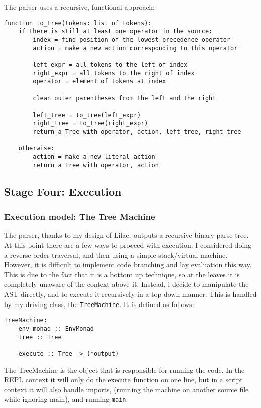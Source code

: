 \documentclass[a4paper, 12pt]{article}
\begin{document}
The parser uses a recursive, functional approach:
\begin{verbatim}
function to_tree(tokens: list of tokens):
	if there is still at least one operator in the source:
		index = find position of the lowest precedence operator
		action = make a new action corresponding to this operator
		
		left_expr = all tokens to the left of index
		right_expr = all tokens to the right of index
		operator = element of tokens at index
		
		clean outer parentheses from the left and the right
		
		left_tree = to_tree(left_expr)
		right_tree = to_tree(right_expr)
		return a Tree with operator, action, left_tree, right_tree
		
	otherwise:
		action = make a new literal action
		return a Tree with operator, action
\end{verbatim}
\subsection{Stage Four: Execution}\label{sec:stage-four-execution}
\subsubsection{Execution model: The Tree Machine}\label{sec:execution-model-the-tree-machine}
The parser, thanks to my design of Lilac, outputs a recursive binary parse tree. At this point there are a few ways to proceed with execution. I considered doing a reverse order traversal, and then using a simple stack/virtual machine. However, it is difficult to implement code branching and lay evaluation this way. This is due to the fact that it is a bottom up technique, so at the leaves it is completely unaware of the context above it. Instead, i decide to manipulate the AST directly, and to execute it recursively in a top down manner. This is handled by my driving class, the \verb|TreeMachine|. It is defined as follows:\\
\begin{verbatim}
TreeMachine:
    env_monad :: EnvMonad
    tree :: Tree
    
    execute :: Tree -> (*output)
\end{verbatim}

The TreeMachine is the object that is responsible for running the code. In the REPL context it will only do the execute function on one line, but in a script context it will also handle imports, (running the machine on another source file while ignoring main), and running \verb|main|.\\
\end{document}
